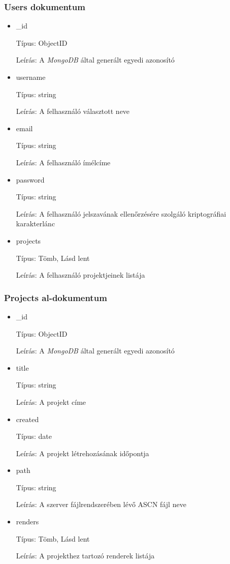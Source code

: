 \subsubsection{Users dokumentum}
\begin{itemize}
    \item \_id
    
    Típus: ObjectID

    Leírás: A \emph{MongoDB} által generált egyedi azonosító
    \item username
    
    Típus: string

    Leírás: A felhasználó választott neve
    \item email
    
    Típus: string

    Leírás: A felhasználó ímélcíme
    \item password
    
    Típus: string

    Leírás: A felhasználó jelszavának ellenőrzésére szolgáló kriptográfiai karakterlánc
    \item projects
    
    Típus: Tömb, Lásd lent

    Leírás: A felhasználó projektjeinek listája
\end{itemize}

\subsubsection{Projects al-dokumentum}

\begin{itemize}
    \item \_id
    
    Típus: ObjectID

    Leírás: A \emph{MongoDB} által generált egyedi azonosító
    \item title
    
    Típus: string

    Leírás: A projekt címe
    \item created
    
    Típus: date

    Leírás: A projekt létrehozásának időpontja
    \item path
    
    Típus: string

    Leírás: A szerver fájlrendszerében lévő ASCN fájl neve
    \item renders
    
    Típus: Tömb, Lásd lent

    Leírás: A projekthez tartozó renderek listája
\end{itemize}

